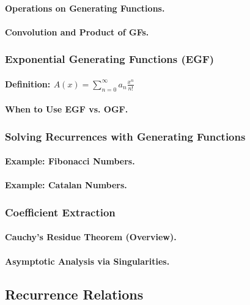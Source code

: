 \paragraph{Operations on Generating Functions.}
\paragraph{Convolution and Product of GFs.}

\subsubsection{Exponential Generating Functions (EGF)}
\paragraph{Definition: $A(x) = \sum_{n=0}^{\infty} a_n \frac{x^n}{n!}$}
\paragraph{When to Use EGF vs. OGF.}

\subsubsection{Solving Recurrences with Generating Functions}
\paragraph{Example: Fibonacci Numbers.}
\paragraph{Example: Catalan Numbers.}

\subsubsection{Coefficient Extraction}
\paragraph{Cauchy's Residue Theorem (Overview).}
\paragraph{Asymptotic Analysis via Singularities.}

\subsection{Recurrence Relations}
\label{subsec:recurrences-combinatorial}

